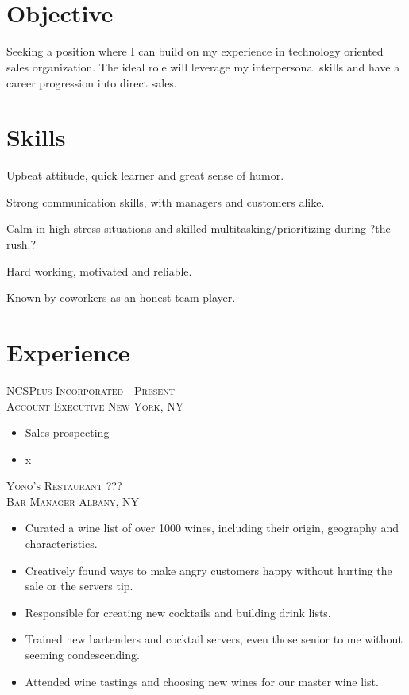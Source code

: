 \documentclass[oneside, final]{scrartcl}
\begin{document}
\begin{center}
 
\textsc{\LARGE{}}\\
\\



\section{Objective}
Seeking a position where I can build on my experience in technology oriented sales organization.
The ideal role will leverage my interpersonal skills and have a career progression into direct sales.

\section{Skills}
\item Upbeat attitude, quick learner and great sense of humor.
\item Strong communication skills, with managers and customers alike.
\item Calm in high stress situations and skilled multitasking/prioritizing during ?the rush.?
\item Hard working, motivated and reliable.
\item Known by coworkers as an honest team player.


\section{Experience}

\textsc{NCSPlus Incorporated \hfill - Present \\}
\textsc{Account Executive \hfill New York, NY\\}
\begin{itemize}
    \item Sales prospecting
    \item x
\end{itemize}

\textsc{Yono's Restaurant \hfill ??? \\}
\textsc{Bar Manager \hfill Albany, NY\\}
\begin{itemize}
    \item Curated a wine list of over 1000 wines, including their origin, geography and characteristics.
    \item Creatively found ways to make angry customers happy without hurting the sale or the servers tip.
    \item Responsible for creating new cocktails and building drink lists.
    \item Trained new bartenders and cocktail servers, even those senior to me without seeming condescending.
    \item Attended wine tastings and choosing new wines for our master wine list.
\end{itemize}


\end{center}
\end{document}
